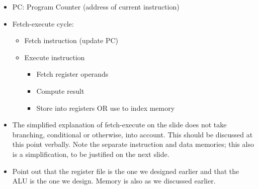 
\begin{frame}[fragile]
\begin{itemize}
\item PC: Program Counter (address of current instruction)
\item Fetch-execute cycle:
\begin{itemize}
\item Fetch instruction (update PC)
\item Execute instruction
\begin{itemize}
\item Fetch register operands
\item Compute result
\item Store into registers OR use to index memory
\end{itemize}
\end{itemize}
\end{itemize}
\BNotes\ifnum{}
\begin{itemize}
\item The simplified explanation of fetch-execute on the slide does not take
	branching, conditional or otherwise, into account. This should be
	discussed at this point verbally. Note the separate instruction and
	data memories; this also is a simplification, to be justified on the
	next slide.
\item Point out that the register file is the one we designed earlier and
	that the ALU is the one we design.
	Memory is also as we discussed earlier.
\end{itemize}
\fi\ENotes
\end{frame}

